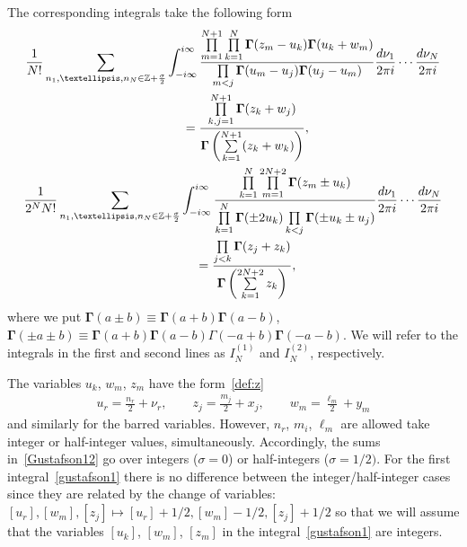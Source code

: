\documentclass[11pt]{article}
\numberwithin{equation}{section}
\numberwithin{equation}{section}
\begin{document}
The corresponding integrals take the following form~\cite{Derkachov:2016ucn,Derkachov:2017pvx}
\begin{subequations}\label{Gustafson12}
\begin{gather}
\frac1{N!} \sum_{n_1,\dots,n_N\in\mathbb{Z}+\frac{\sigma}{2}}
\int_{-{\rm i}\infty}^{{\rm i}\infty}
\frac{\prod\limits_{m=1}^{N+1}\prod\limits_{k=1}^{N}
\boldsymbol{\Gamma}(z_m-u_k)\boldsymbol{\Gamma}(u_k+w_m)}{ \prod\limits_{m<j}
\boldsymbol{\Gamma}(u_m- u_j)\boldsymbol{\Gamma}(u_j- u_m)}
\frac{{\rm d}\nu_1}{2\pi {\rm i}}\cdots\frac{{\rm d}\nu_N}{2\pi {\rm i}}\nonumber\\
\qquad{} =\frac{\prod\limits_{k,j=1}^{N+1}\boldsymbol{\Gamma}(z_k+ w_j)}{
\boldsymbol{\Gamma}\left(\sum\limits_{k=1}^{N+1} (z_k+w_k) \right)},\label{gustafson1}\\
\frac1{2^{N}N!}\sum_{n_1,\dots,n_N\in\mathbb{Z}+\frac{\sigma}{2}}
\int_{-{\rm i}\infty}^{{\rm i}\infty}
\frac{ \prod\limits_{k=1}^{N} \prod\limits_{m=1}^{2N+2}
 \boldsymbol{\Gamma}(z_m\pm u_k)}
{\prod\limits_{k=1}^{N}{\boldsymbol{\Gamma}}(\pm 2u_k) \prod\limits_{ k<j} {\boldsymbol{\Gamma}} (\pm u_k\pm u_j)
}\frac{{\rm d}\nu_1}{2\pi {\rm i}}\cdots\frac{{\rm d}\nu_N}{2\pi {\rm i}}\nonumber\\
\qquad{} = \frac{\prod\limits_{j<k}{\boldsymbol{\Gamma}}(z_j + z_k)}{{\boldsymbol{\Gamma}}\left(\sum\limits_{k=1}^{2N+2} z_k\right)}, \label{gustafson2}
\end{gather}
\end{subequations}
where we put $\boldsymbol \Gamma(a\pm b)\equiv \boldsymbol \Gamma(a+b) \boldsymbol \Gamma(a-b)$, $\boldsymbol
\Gamma(\pm a\pm b)\equiv \boldsymbol \Gamma(a+b) \boldsymbol \Gamma(a-b)\Gamma(-a+b) \boldsymbol \Gamma(-a-b)$. We will
refer to the integrals in the first and second lines as $I_N^{(1)}$ and $I_N^{(2)}$, respectively.

The variables $u_k$, $w_m$, $z_m$ have the form~\eqref{def:z}
\begin{gather*}
u_r=\frac{n_r}2+ \nu_r, \qquad z_j=\frac{m_j}2+ x_j, \qquad w_m=\frac{\ell_m}2+ y_m
\end{gather*}
and similarly for the barred variables. However, $n_r$, $m_i$, $\ell_m$ are allowed take integer or half-integer values,
simultaneously. Accordingly, the sums in~\eqref{Gustafson12} go over integers ($\sigma=0$) or half-integers
($\sigma=1/2)$. For the first integral~\eqref{gustafson1} there is no difference between the integer/half-integer cases
since they are related by the change of variables: $[u_r], [w_m], [z_j] \mapsto [u_r]+1/2, [w_m]-1/2,[z_j]+1/2$ so that we will assume that the variables $[u_k]$, $[w_m]$, $[z_m]$ in the integral~\eqref{gustafson1} are integers.
\end{document}
